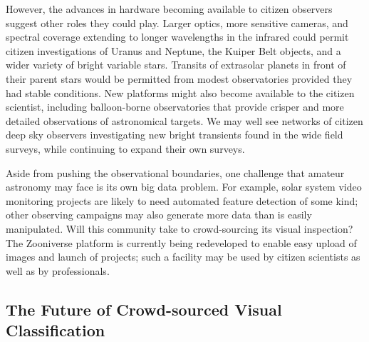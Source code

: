 \documentclass{ar2e}
\begin{document}
However, the advances in hardware becoming available to citizen observers
suggest other roles they could play. Larger optics, more sensitive cameras, and
spectral coverage extending to longer wavelengths in the infrared could permit
citizen investigations of Uranus and Neptune, the Kuiper
Belt objects, and a wider variety of bright variable stars.  Transits of
extrasolar planets in front of their parent stars would be permitted from modest
observatories provided they had stable conditions.  New platforms might also
become available to the citizen scientist, including balloon-borne observatories
that provide crisper and more detailed observations of astronomical targets. We
may well see networks of citizen deep sky observers investigating new bright
transients found in the wide field surveys,  while continuing to expand their
own surveys.

Aside from pushing the observational boundaries, one challenge that amateur
astronomy may face is its own big data problem.   For example, solar system
video monitoring projects are likely to need automated feature detection of some
kind; other observing campaigns may also generate more data than is easily
manipulated. Will this community take to crowd-sourcing its visual inspection?
The Zooniverse platform is currently being redeveloped to enable easy upload of images
and launch of projects; such a facility may be used by citizen scientists as well as by 
professionals. 



% 

\subsection{The Future of Crowd-sourced Visual Classification}
\label{sec:future_csvis}
\end{document}
